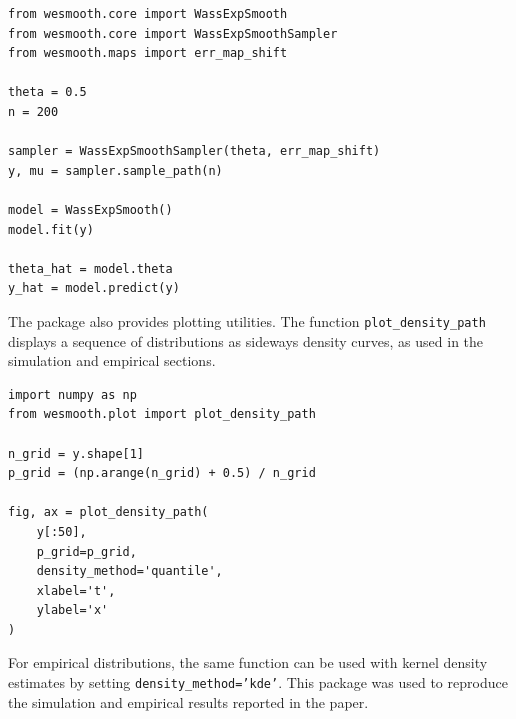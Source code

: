 \documentclass[a4paper, 11pt]{article}
\theoremstyle{definition}
\begin{document}
\begin{mdframed}
\begin{lstlisting}
from wesmooth.core import WassExpSmooth
from wesmooth.core import WassExpSmoothSampler
from wesmooth.maps import err_map_shift

theta = 0.5
n = 200

sampler = WassExpSmoothSampler(theta, err_map_shift)
y, mu = sampler.sample_path(n)

model = WassExpSmooth()
model.fit(y)

theta_hat = model.theta
y_hat = model.predict(y)
\end{lstlisting}
\end{mdframed}

The package also provides plotting utilities. 
The function \texttt{plot\_density\_path} displays a sequence of distributions as sideways density curves, as used in the simulation and empirical sections.

\begin{mdframed}
\begin{lstlisting}
import numpy as np
from wesmooth.plot import plot_density_path

n_grid = y.shape[1]
p_grid = (np.arange(n_grid) + 0.5) / n_grid

fig, ax = plot_density_path(
    y[:50],
    p_grid=p_grid,
    density_method='quantile',
    xlabel='t',
    ylabel='x'
)
\end{lstlisting}
\end{mdframed}

For empirical distributions, the same function can be used with kernel density estimates by setting \texttt{density\_method='kde'}. This package was used to reproduce the simulation and empirical results reported in the paper.
\end{document}
